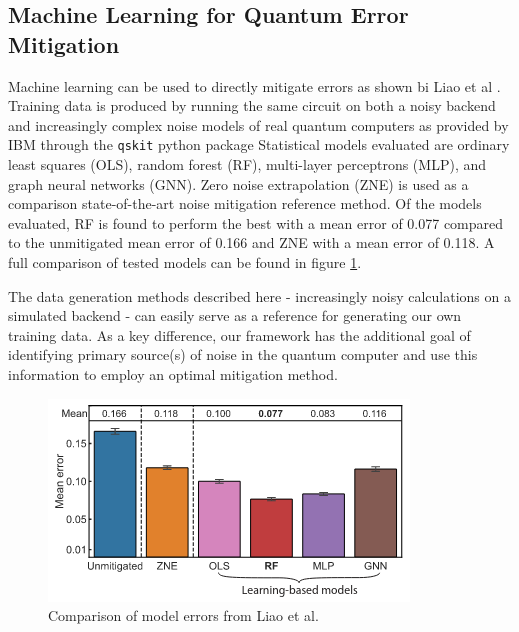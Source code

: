 \subsection{Machine Learning for Quantum Error Mitigation}
\label{sec:liaoMachineMit}

\cite{liao_machine_2024}
Machine learning can be used to directly mitigate errors as shown bi Liao et al \cite{liao_machine_2024}.
Training data is produced by running the same circuit on both a noisy backend and increasingly complex noise models of real quantum computers as provided by IBM through the \verb|qskit| python package \cite{javadi-abhari_quantum_2024}
Statistical models evaluated are ordinary least squares (OLS), random forest (RF), multi-layer perceptrons (MLP), and graph neural networks (GNN).
Zero noise extrapolation (ZNE) is used as a comparison state-of-the-art noise mitigation reference method.
Of the models evaluated, RF is found to perform the best with a mean error of 0.077 compared to the unmitigated mean error of 0.166 and ZNE with a mean error of 0.118.
A full comparison of tested models can be found in figure \ref{fig:liao_comparison}.

The data generation methods described here - increasingly noisy calculations on a simulated backend - can easily serve as a reference for generating our own training data.  %
As a key difference, our framework has the additional goal of identifying primary source(s) of noise in the quantum computer and use this information to employ an optimal mitigation method.

\begin{figure}[t]
    \centering
    \includegraphics[width=0.5\linewidth]{figures/liao_comparison.png}
    \caption{Comparison of model errors from Liao et al. \cite{liao_machine_2024}}
    \label{fig:liao_comparison}
\end{figure}
